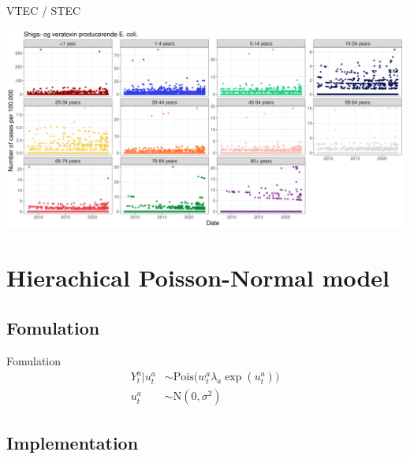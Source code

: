 \documentclass[aspectratio=169]{beamer}
\begin{document}
\begin{frame}{VTEC / STEC}
\tiny

\includegraphics[width=1\linewidth]{../figures/ShigaogveratoxinproducerendeEcolixAgeGroup}

\normalsize
\end{frame}

\hypertarget{hierachical-poisson-normal-model}{%
\section{Hierachical Poisson-Normal
model}\label{hierachical-poisson-normal-model}}

\hypertarget{fomulation}{%
\subsection{Fomulation}\label{fomulation}}

\begin{frame}{Fomulation}
\begin{subequations}
  \begin{alignat}{2}
    Y_{t}^{a}|u_{t}^{a} &\sim \mathrm{Pois} \big( w_{t}^{a} \lambda_{a} \exp(u_{t}^{a}) \big) \label{eq:pois_ln0} \\ 
    u_{t}^{a} &\sim \mathrm{N}(0,\sigma^2) \label{eq:pois_ln1}
  \end{alignat}
\end{subequations}
\end{frame}

\hypertarget{implementation}{%
\subsection{Implementation}\label{implementation}}
\end{document}
